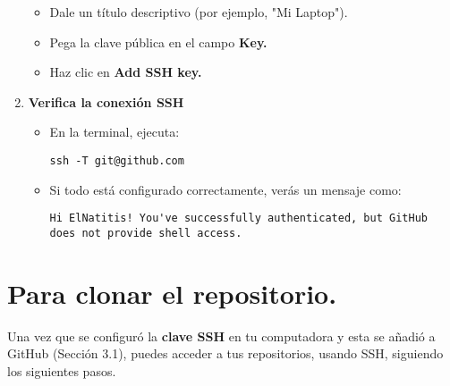 \documentclass[10pt,a4paper]{book}
\begin{document}
\begin{enumerate}
\begin{itemize}
		\item Dale un título descriptivo (por ejemplo, "Mi Laptop").

		\item Pega la clave pública en el campo \textbf{Key.}

		\item Haz clic en \textbf{Add SSH key.}
	\end{itemize}
	\item \textbf{Verifica la conexión SSH}
	\begin{itemize}
		\item En la terminal, ejecuta:
		\begin{lstlisting}
ssh -T git@github.com
		\end{lstlisting}
		\item Si todo está configurado correctamente, verás un mensaje como:
		\begin{lstlisting}
Hi ElNatitis! You've successfully authenticated, but GitHub does not provide shell access.
		\end{lstlisting}
	\end{itemize}
\end{enumerate}
\newpage
\section{Para clonar el repositorio.}
Una vez que se configuró la \textbf{clave SSH} en tu computadora y esta se añadió a GitHub (Sección 3.1), puedes acceder a tus repositorios, usando SSH, siguiendo los siguientes pasos.
\end{document}
